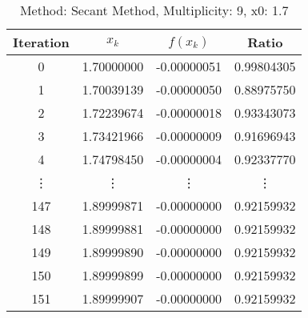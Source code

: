 \begin{table}
\centering
\caption{Method: Secant Method, Multiplicity: 9, x0: 1.7}
\label{tab:table_Secant_Method_9_1_7}
\begin{tabular}{c c c c}
\toprule
Iteration &      $x_k$ &    $f(x_k)$ &      Ratio \\
\midrule
        0 & 1.70000000 & -0.00000051 & 0.99804305 \\
        1 & 1.70039139 & -0.00000050 & 0.88975750 \\
        2 & 1.72239674 & -0.00000018 & 0.93343073 \\
        3 & 1.73421966 & -0.00000009 & 0.91696943 \\
        4 & 1.74798450 & -0.00000004 & 0.92337770 \\
   \vdots &     \vdots &      \vdots &     \vdots \\
      147 & 1.89999871 & -0.00000000 & 0.92159932 \\
      148 & 1.89999881 & -0.00000000 & 0.92159932 \\
      149 & 1.89999890 & -0.00000000 & 0.92159932 \\
      150 & 1.89999899 & -0.00000000 & 0.92159932 \\
      151 & 1.89999907 & -0.00000000 & 0.92159932 \\
\bottomrule
\end{tabular}
\end{table}
